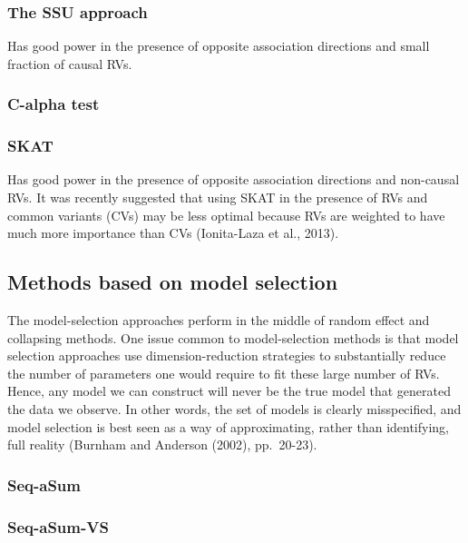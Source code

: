 \documentclass[]{book}
\theoremstyle{definition}
\theoremstyle{definition}
\theoremstyle{definition}
\theoremstyle{remark}
\begin{document}
\subsubsection{The SSU approach}\label{the-ssu-approach}

Has good power in the presence of opposite association directions and
small fraction of causal RVs.

\subsubsection{C-alpha test}\label{c-alpha-test}

\subsubsection{SKAT}\label{skat}

Has good power in the presence of opposite association directions and
non-causal RVs. It was recently suggested that using SKAT in the
presence of RVs and common variants (CVs) may be less optimal because
RVs are weighted to have much more importance than CVs (Ionita-Laza et
al., 2013).

\subsection{Methods based on model
selection}\label{methods-based-on-model-selection}

The model-selection approaches perform in the middle of random eﬀect and
collapsing methods. One issue common to model-selection methods is that
model selection approaches use dimension-reduction strategies to
substantially reduce the number of parameters one would require to ﬁt
these large number of RVs. Hence, any model we can construct will never
be the true model that generated the data we observe. In other words,
the set of models is clearly misspeciﬁed, and model selection is best
seen as a way of approximating, rather than identifying, full reality
(Burnham and Anderson (2002), pp.~20-23).

\subsubsection{Seq-aSum}\label{seq-asum}

\subsubsection{Seq-aSum-VS}\label{seq-asum-vs}
\end{document}
